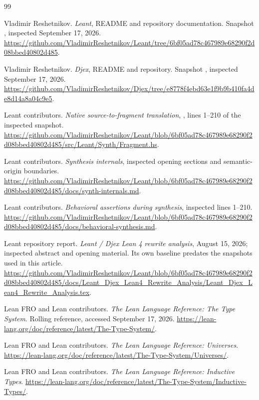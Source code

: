 \clearpage
\begin{thebibliography}{99}
\small
\raggedright
{}
Vladimir Reshetnikov. \emph{Leant}, README and repository documentation.
Snapshot , inspected September 17, 2026.
\url{https://github.com/VladimirReshetnikov/Leant/tree/6bf05ad78c467989e68290f2d08bbed40802d485}.

Vladimir Reshetnikov. \emph{Djex}, README and repository.
Snapshot , inspected September 17, 2026.
\url{https://github.com/VladimirReshetnikov/Djex/tree/e8778f4ebd63e1f9b9b410fa4de8d14a8a04c9e5}.

Leant contributors. \emph{Native source-to-fragment translation}, , lines 1--210 of the inspected snapshot.
\url{https://github.com/VladimirReshetnikov/Leant/blob/6bf05ad78c467989e68290f2d08bbed40802d485/src/Leant/Synth/Fragment.hs}.

Leant contributors. \emph{Synthesis internals}, inspected opening sections and semantic-origin boundaries.
\url{https://github.com/VladimirReshetnikov/Leant/blob/6bf05ad78c467989e68290f2d08bbed40802d485/docs/synth-internals.md}.

Leant contributors. \emph{Behavioral assertions during synthesis}, inspected lines 1--210.
\url{https://github.com/VladimirReshetnikov/Leant/blob/6bf05ad78c467989e68290f2d08bbed40802d485/docs/behavioral-synthesis.md}.

Leant repository report. \emph{Leant / Djex Lean 4 rewrite analysis}, August 15, 2026; inspected abstract and opening material. Its own baseline predates the snapshots used in this article.
\url{https://github.com/VladimirReshetnikov/Leant/blob/6bf05ad78c467989e68290f2d08bbed40802d485/docs/Leant_Djex_Lean4_Rewrite_Analysis/Leant_Djex_Lean4_Rewrite_Analysis.tex}.

Lean FRO and Lean contributors. \emph{The Lean Language Reference: The Type System}. Rolling reference, accessed September 17, 2026.
\url{https://lean-lang.org/doc/reference/latest/The-Type-System/}.

Lean FRO and Lean contributors. \emph{The Lean Language Reference: Universes}.
\url{https://lean-lang.org/doc/reference/latest/The-Type-System/Universes/}.

Lean FRO and Lean contributors. \emph{The Lean Language Reference: Inductive Types}.
\url{https://lean-lang.org/doc/reference/latest/The-Type-System/Inductive-Types/}.


\end{thebibliography}
